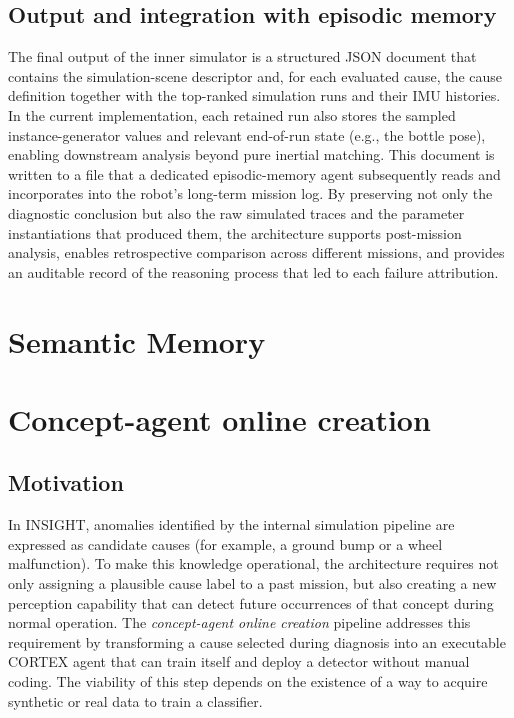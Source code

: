 \documentclass[a4paper, twoside]{article}
\begin{document}
\subsection{Output and integration with episodic memory}

The final output of the inner simulator is a structured JSON document that contains the simulation-scene descriptor and, for each evaluated cause, the cause definition together with the top-ranked simulation runs and their IMU histories.
In the current implementation, each retained run also stores the sampled instance-generator values and relevant end-of-run state (e.g., the bottle pose), enabling downstream analysis beyond pure inertial matching.
This document is written to a file that a dedicated episodic-memory agent subsequently reads and incorporates into the robot's long-term mission log.
By preserving not only the diagnostic conclusion but also the raw simulated traces and the parameter instantiations that produced them, the architecture supports post-mission analysis, enables retrospective comparison across different missions, and provides an auditable record of the reasoning process that led to each failure attribution.


\section{Semantic Memory}


\section{Concept-agent online creation}
\subsection{Motivation}

In INSIGHT, anomalies identified by the internal simulation pipeline are expressed as candidate causes (for example, a ground bump or a wheel malfunction).
To make this knowledge operational, the architecture requires not only assigning a plausible cause label to a past mission, but also creating a new perception capability that can detect future occurrences of that concept during normal operation. 
The \emph{concept-agent online creation} pipeline addresses this requirement by transforming a cause selected during diagnosis into an executable CORTEX  agent that can train itself and deploy a detector without manual coding.
The viability of this step depends on the existence of a way to acquire synthetic or real data to train a classifier.
\end{document}
